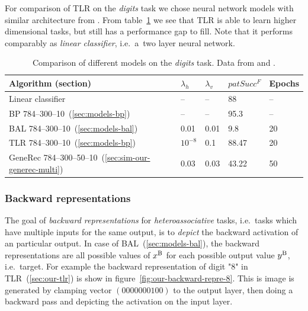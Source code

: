 For comparison of TLR on the \emph{digits} task we chose neural network models with similar architecture from \citet{digits2014mnist}. From table~\ref{tab:results-cmp-digits} we see that TLR is able to learn higher dimensional tasks, but still has a performance gap to fill. Note that it performs comparably as \emph{linear classifier}, i.e.~a~two layer neural network. 

\begin{table}[H] 
  \centering
    \begin{tabular}{|l|l|l|l|l|}
    \hline
    Algorithm (section)&$\lambda_h$&$\lambda_v$&$patSucc^F$ &Epochs\\ %
    \hline
    Linear classifier & -- & -- & 88 & -- \\ 
    \hline
    BP 784--300--10~(\ref{sec:models-bp})& -- & -- & 95.3 & -- \\ 
    \hline 
    BAL 784--300--10~(\ref{sec:models-bal})& 0.01 & 0.01 & 9.8 & 20 \\
    \hline 
    TLR 784--300--10~(\ref{sec:models-bp})& $10^{-8}$ & 0.1 & 88.47 & 20 \\
    \hline 
    GeneRec 784--300--50--10~(\ref{sec:sim-our-generec-multi})& 0.03 & 0.03 & 43.22 & 50 \\
    \hline 
    \end{tabular}
  \caption{Comparison of different models on the \emph{digits} task. Data from \citet{lecun1998gradient} and \citet{digits2014mnist}.} 
  \label{tab:results-cmp-digits}
\end{table}

\subsubsection{Backward representations} 
\label{sec:our-backward-repre}

The goal of \emph{backward representations} for \emph{heteroassociative} tasks, i.e.~tasks which have multiple inputs for the same output, is to \emph{depict} the backward activation of an particular output. In case of BAL~(\ref{sec:models-bal}), the backward representations are all possible values of $x^{\rm B}$ for each possible output value $y^{\rm B}$, i.e.~target. For example the backward representation of digit "8" in TLR~(\ref{sec:our-tlr}) is show in figure~\ref{fig:our-backward-repre-8}. This is image is generated by clamping vector $(0000000100)$ to the output layer, then doing a backward pass and depicting the activation on the input layer. 

